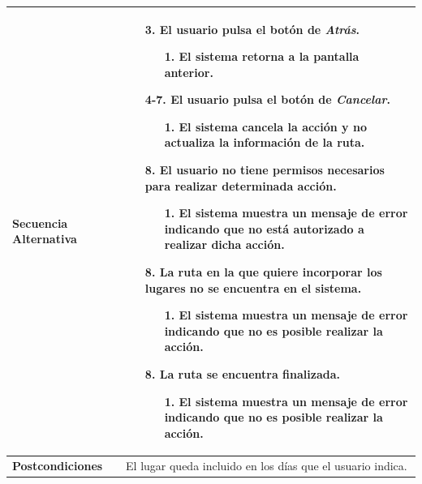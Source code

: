 \begin{longtable}{| p{4cm} | p{10cm} |}
\\
\hline
\textbf{Secuencia Alternativa} &\mbox{}\par\vspace{-\baselineskip}
\begin{enumerate}[leftmargin=0.9cm, topsep=0.1cm]
\item[3.] El usuario pulsa el botón de \textit{Atrás}.
	\begin{itemize}
	\item[1.] El sistema retorna a la pantalla anterior.
	\end{itemize}
\item[4-7.] El usuario pulsa el botón de \textit{Cancelar}.
	\begin{itemize}
	\item[1.] El sistema cancela la acción y no actualiza la información de la ruta.
	\end{itemize}
\item[8.] El usuario no tiene permisos necesarios para realizar determinada acción.
	\begin{itemize}
	\item[1.] El sistema muestra un mensaje de error indicando que no está autorizado a realizar dicha acción.
	\end{itemize}
\item[8.] La ruta en la que quiere incorporar los lugares no se encuentra en el sistema.
	\begin{itemize}
	\item[1.] El sistema muestra un mensaje de error indicando que no es posible realizar la acción.
	\end{itemize}
\item[8.] La ruta se encuentra finalizada.
	\begin{itemize}
	\item[1.] El sistema muestra un mensaje de error indicando que no es posible realizar la acción.
	\end{itemize}	
\end{enumerate}
\\

\hline
\textbf{Postcondiciones} & 
El lugar queda incluido en los días que el usuario indica.\\
\hline
\end{longtable}



\newpage
